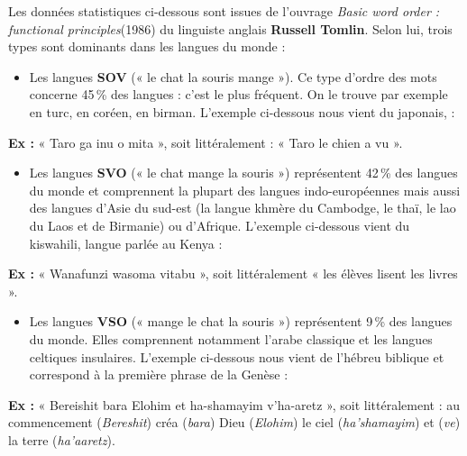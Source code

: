 Les données statistiques ci-dessous sont issues de l’ouvrage \textit{Basic word order : functional principles}(1986) du linguiste anglais \textbf{Russell Tomlin}. Selon lui, trois types sont dominants dans les langues du monde :
\begin{itemize}
\item Les langues \textbf{SOV} (« le chat la souris mange »). Ce type d’ordre des mots concerne 45\,\% des langues : c’est le plus fréquent. On le trouve par exemple en turc, en coréen, en birman. L’exemple ci-dessous nous vient du japonais, :
\end{itemize}
\noindent\textbf{Ex :} « Taro ga inu o mita », soit littéralement : « Taro le chien a vu ».
\begin{itemize}
\item Les langues \textbf{SVO} (« le chat mange la souris ») représentent 42\,\% des langues du monde
et comprennent la plupart des langues indo-européennes mais aussi des langues d’Asie du sud-est (la langue khmère du Cambodge, le thaï, le lao du Laos et de Birmanie) ou d’Afrique. L’exemple ci-dessous vient du kiswahili, langue parlée au Kenya :
\end{itemize}
\noindent\textbf{Ex :} « Wanafunzi wasoma vitabu », soit littéralement « les élèves lisent les livres ».
\begin{itemize}
\item Les langues \textbf{VSO} (« mange le chat la souris ») représentent 9\,\% des langues du monde. Elles comprennent notamment l’arabe classique et les langues celtiques insulaires. L’exemple ci-dessous nous vient de l’hébreu biblique et correspond à la première phrase de la Genèse :
\end{itemize}
\noindent\textbf{Ex :} « Bereishit bara Elohim et ha-shamayim v’ha-aretz », soit littéralement : au commencement (\textit{Bereshit}) créa (\textit{bara}) Dieu (\textit{Elohim}) le ciel (\textit{ha’shamayim}) et (\textit{ve}) la terre (\textit{ha’aaretz}).

